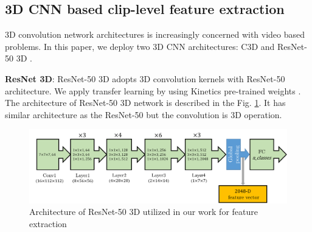 
\subsection{3D CNN based clip-level feature extraction}
    3D convolution network architectures is increasingly concerned with video based problems. 
    In this paper, we deploy two 3D CNN architectures: C3D \cite{duta2017spatio} and ResNet-50 3D \cite{hara2018can}. 

    \textbf{ResNet 3D}: ResNet-50 3D adopts 3D convolution kernels with ResNet-50 architecture. We apply transfer learning by using Kinetics pre-trained weights \cite{kay2017kinetics}. %
    The architecture of ResNet-50 3D network is described in the Fig. \ref{fig:resnet50_3d}. It has similar architecture as the ResNet-50 but the convolution is 3D operation.  
    \begin{figure}[htbp]
        \centering
        \includegraphics[width=1\linewidth]{Figs/Resnet50_3D.png}
        \caption{Architecture of ResNet-50 3D utilized in our work for feature extraction}
        \label{fig:resnet50_3d}
    \end{figure}


